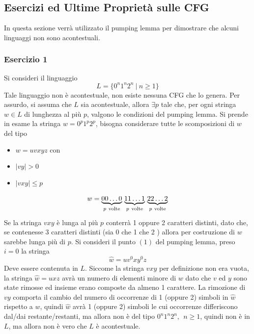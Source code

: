 \documentclass[10pt, letterpaper]{report}
\begin{document}
\subsection{Esercizi ed Ultime Proprietà sulle CFG}
In questa sezione verrà utilizzato il pumping lemma per dimostrare che alcuni linguaggi non sono acontestuali.
\subsubsection{Esercizio 1}
Si consideri il linguaggio 
$$ L=\{0^n1^n2^n \ | \ n \ge 1 \}$$
Tale linguaggio non è acontestuale, non esiste nessuna CFG che lo genera. Per assurdo, si assuma che 
$L$ sia acontestuale, allora $\exists p$ tale che, per ogni stringa $w\in L$ di lunghezza al più 
$p$, valgono le condizioni del pumping lemma. \acc 
Si prende in esame la stringa $w=0^p1^p2^p$, bisogna considerare tutte le scomposizioni di $w$ del tipo\begin{itemize}
    \item $w=uvxyz$ con  
    \item $|vy|>0$
    \item $|vxy|\le p$
\end{itemize}
$$ w=\smash{\underbrace{00\dots 0}_{p\ \text{volte}}} \
\smash{\underbrace{11\dots 1}_{p\ \text{volte}}} \
\smash{\underbrace{22\dots 2}_{p\ \text{volte}}}$$
\\Se la stringa $vxy$ è lunga al più $p$ conterrà 1 oppure 2 caratteri distinti, dato che, se contenesse 3 caratteri distinti (sia 0 che 1 che 2 ) allora 
per costruzione di $w$ sarebbe lunga più di $p$. Si consideri il punto $(1)$ del pumping lemma, preso $i=0$ la stringa 
$$ \hat w=uv^0xy^0z$$
Deve essere contenuta in $L$. Siccome la stringa $vxy$ per definizione non era vuota, la stringa $\hat w = uxz$ 
avrà un numero di elementi minore di $w$ dato che $v$ ed $y$ sono state rimosse ed insieme erano composte da 
almeno 1 carattere. 
\acc 
La rimozione di $vy$ comporta il cambio del numero di occorrenze di 1 (oppure 2) simboli in $\hat w$ rispetto a 
$w$, quindi $\hat w$ avrà 1 (oppure 2) simboli le cui occorrenze differiscono dal/dai restante/restanti, ma allora 
non è del tipo $0^n1^n2^n, \ \ n \ge 1$, quindi non è in $L$, ma allora non è vero che 
$L$ è acontestuale.
\end{document}
